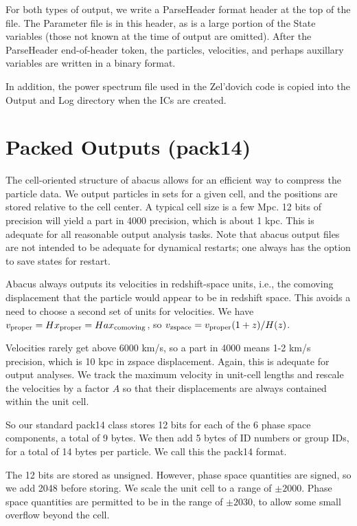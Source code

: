 \documentclass[11pt,preprint]{aastex}
\begin{document}
For both types of output, we write a ParseHeader format header at
the top of the file.  The Parameter file is in this header, as is
a large portion of the State variables (those not known at the time
of output are omitted).  After the ParseHeader end-of-header token,
the particles, velocities, and perhaps auxillary variables are written
in a binary format.

In addition, the power spectrum file used in the Zel'dovich code
is copied into the Output and Log directory when the ICs are created.

\section{Packed Outputs (pack14)}

The cell-oriented structure of abacus allows for an efficient way
to compress the particle data.  We output particles in sets for a
given cell, and the positions are stored relative to the cell center.
A typical cell size is a few Mpc.  12 bits of precision will yield
a part in 4000 precision, which is about 1 kpc.  This is adequate
for all reasonable output analysis tasks.  Note that abacus output
files are not intended to be adequate for dynamical restarts; one
always has the option to save states for restart.

Abacus always outputs its velocities in redshift-space units, i.e.,
the comoving displacement that the particle would appear to be in
redshift space.  This avoids a need to choose a second set of units
for velocities.  We have $v_{\rm proper} = Hx_{\rm proper} =
Hax_{\rm comoving}$, so $v_{\rm zspace} = v_{\rm proper}(1+z)/H(z)$.

Velocities rarely get above 6000 km/s, so a part in 4000 means 1-2
km/s precision, which is 10 kpc in zspace displacement.  Again, this
is adequate for output analyses.  We track the maximum velocity 
in unit-cell lengths and rescale the velocities by a factor $A$ 
so that their displacements are always contained within the unit cell.

So our standard pack14 class stores 12 bits for each of the 6 phase
space components, a total of 9 bytes.  We then add 5 bytes of ID
numbers or group IDs, for a total of 14 bytes per particle.  We call
this the pack14 format.

The 12 bits are stored as unsigned.  However, phase space quantities
are signed, so we add 2048 before storing.  We scale the unit cell 
to a range of $\pm2000$.  Phase space quantities are permitted to 
be in the range of $\pm2030$, to allow some small overflow beyond 
the cell.
\end{document}
